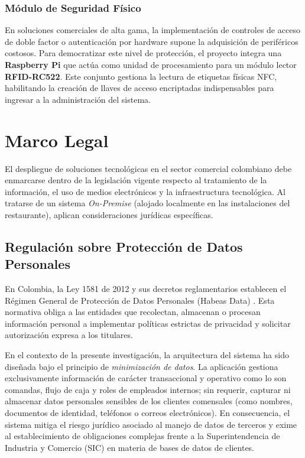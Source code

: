 \subsubsection{Módulo de Seguridad Físico}
En soluciones comerciales de alta gama, la implementación de controles de acceso de doble factor o autenticación por hardware supone la adquisición de periféricos costosos. Para democratizar este nivel de protección, el proyecto integra una \textbf{Raspberry Pi} que actúa como unidad de procesamiento para un módulo lector \textbf{RFID-RC522}. Este conjunto gestiona la lectura de etiquetas físicas NFC, habilitando la creación de llaves de acceso encriptadas indispensables para ingresar a la administración del sistema.


\section{Marco Legal}
El despliegue de soluciones tecnológicas en el sector comercial colombiano debe enmarcarse dentro de la legislación vigente respecto al tratamiento de la información, el uso de medios electrónicos y la infraestructura tecnológica. Al tratarse de un sistema \textit{On-Premise} (alojado localmente en las instalaciones del restaurante), aplican consideraciones jurídicas específicas.

\subsection{Regulación sobre Protección de Datos Personales}
En Colombia, la Ley 1581 de 2012 y sus decretos reglamentarios establecen el Régimen General de Protección de Datos Personales (Habeas Data) \cite{ley1581}. Esta normativa obliga a las entidades que recolectan, almacenan o procesan información personal a implementar políticas estrictas de privacidad y solicitar autorización expresa a los titulares. 

En el contexto de la presente investigación, la arquitectura del sistema ha sido diseñada bajo el principio de \textit{minimización de datos}. La aplicación gestiona exclusivamente información de carácter transaccional y operativo como lo son comandas, flujo de caja y roles de empleados internos; sin requerir, capturar ni almacenar datos personales sensibles de los clientes comensales (como nombres, documentos de identidad, teléfonos o correos electrónicos). En consecuencia, el sistema mitiga el riesgo jurídico asociado al manejo de datos de terceros y exime al establecimiento de obligaciones complejas frente a la Superintendencia de Industria y Comercio (SIC) en materia de bases de datos de clientes.

